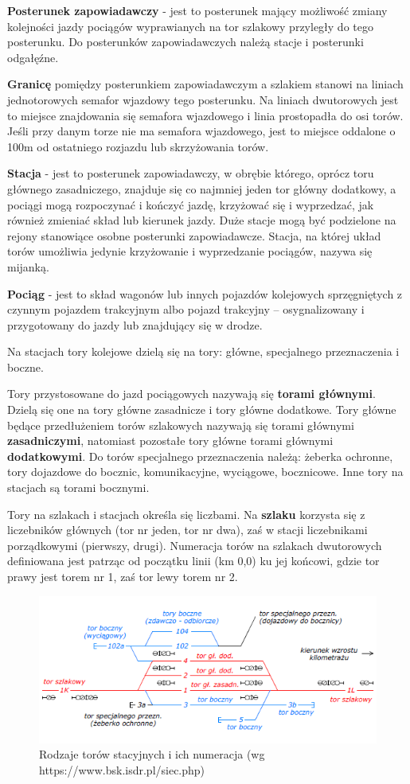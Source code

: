 \textbf{Posterunek zapowiadawczy} - jest to posterunek mający możliwość zmiany kolejności jazdy pociągów wyprawianych na tor szlakowy przyległy do tego posterunku. Do posterunków zapowiadawczych należą stacje i posterunki odgałęźne.

\textbf{Granicę} pomiędzy posterunkiem zapowiadawczym a szlakiem stanowi na liniach jednotorowych semafor wjazdowy tego posterunku. Na liniach dwutorowych jest to miejsce znajdowania się semafora wjazdowego i linia prostopadła do osi torów. Jeśli przy danym torze nie ma semafora wjazdowego, jest to miejsce oddalone o 100m od ostatniego rozjazdu lub skrzyżowania torów.

\textbf{Stacja} - jest to posterunek zapowiadawczy, w obrębie którego, oprócz toru głównego zasadniczego, znajduje się co najmniej jeden tor główny dodatkowy, a pociągi mogą rozpoczynać i kończyć jazdę, krzyżować się i wyprzedzać, jak również zmieniać skład lub kierunek jazdy. Duże stacje mogą być podzielone na rejony stanowiące osobne posterunki zapowiadawcze. Stacja, na której układ torów umożliwia jedynie krzyżowanie i wyprzedzanie pociągów, nazywa się mijanką.

\textbf{Pociąg} - jest to skład wagonów lub innych pojazdów kolejowych sprzęgniętych z czynnym pojazdem trakcyjnym albo pojazd trakcyjny – osygnalizowany i przygotowany do jazdy lub znajdujący się w drodze.

Na stacjach tory kolejowe dzielą się na tory: główne, specjalnego przeznaczenia i boczne.

Tory przystosowane do jazd pociągowych nazywają się \textbf{torami głównymi}. Dzielą się one na tory główne zasadnicze i tory główne dodatkowe. Tory główne będące przedłużeniem torów szlakowych nazywają się torami głównymi \textbf{zasadniczymi}, natomiast pozostałe tory główne torami głównymi \textbf{dodatkowymi}. Do torów specjalnego przeznaczenia należą: żeberka ochronne, tory dojazdowe do bocznic, komunikacyjne, wyciągowe, bocznicowe. Inne tory na stacjach są torami bocznymi.

Tory na szlakach i stacjach określa się liczbami. Na \textbf{szlaku} korzysta się z liczebników głównych (tor nr jeden, tor nr dwa), zaś w stacji liczebnikami porządkowymi (pierwszy, drugi). Numeracja torów na szlakach dwutorowych definiowana jest patrząc od początku linii (km 0,0) ku jej końcowi, gdzie tor prawy jest torem nr 1, zaś tor lewy torem
nr 2.
	\begin{figure}
	\includegraphics[width=13cm]{skryptkierownik-img/tory-numery.png}
	\caption{Rodzaje torów stacyjnych i ich numeracja (wg https://www.bsk.isdr.pl/siec.php)}
	\label{fig:numeracja-torow}
\end{figure}

